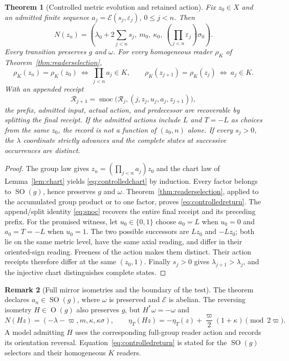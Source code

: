 \documentclass[10pt,letterpaper]{article}
\newtheorem{theorem}{Theorem}[section]
\theoremstyle{definition}\newtheorem{definition}[theorem]{Definition}
\newtheorem{remark}[theorem]{Remark}
\newcommand{\eps}{\varepsilon}
\newcommand{\SO}{\operatorname{SO}}
\newcommand{\OO}{\operatorname{O}}
\newcommand{\snoc}{\operatorname{snoc}}
\newcommand{\varp}{\varpi}
\begin{document}
\begin{theorem}[Controlled metric evolution and retained action]\label{thm:controlled}
Fix $z_0\in X$ and an admitted finite sequence $a_j=\mathcal E(s_j,\eps_j)$, $0\le j<n$. Then
\begin{equation}\label{eq:controlledchart}
 N(z_n)=\left(\lambda_0+2\sum_{j<n}s_j,\ m_0,\ \kappa_0,\ (\prod_{j<n}\eps_j)\sigma_0\right).
\end{equation}
Every transition preserves $g$ and $\omega$. For every homogeneous reader $\rho_K$ of Theorem~\ref{thm:readerselection},
\begin{equation}\label{eq:controlledreturn}
 \rho_K(z_n)=\rho_K(z_0)\ \Longleftrightarrow\ \prod_{j<n}a_j\in K,
 \qquad \rho_K(z_{j+1})=\rho_K(z_j)\ \Longleftrightarrow\ a_j\in K.
\end{equation}
With an appended receipt
\begin{equation}\label{eq:controlledrec}
 \mathcal R_{j+1}=\snoc\bigl(\mathcal R_j,(j,z_j,u_j,a_j,z_{j+1})\bigr),
\end{equation}
the prefix, admitted input, actual action, and predecessor are recoverable by splitting the final receipt. If the admitted actions include $L$ and $T=-L$ as choices from the same $z_0$, the record is not a function of $(z_0,n)$ alone. If every $s_j>0$, the $\lambda$ coordinate strictly advances and the complete states at successive occurrences are distinct.
\end{theorem}
\begin{proof}
The group law gives $z_n=(\prod_{j<n}a_j)z_0$ and the chart law of Lemma~\ref{lem:chart} yields \eqref{eq:controlledchart} by induction. Every factor belongs to $\SO(g)$, hence preserves $g$ and $\omega$. Theorem~\ref{thm:readerselection}, applied to the accumulated group product or to one factor, proves \eqref{eq:controlledreturn}. The append/split identity \eqref{eq:snoc} recovers the entire final receipt and its preceding prefix.
For the promised witness, let $u_0\in\{0,1\}$ choose $a_0=L$ when $u_0=0$ and $a_0=T=-L$ when $u_0=1$. The two possible successors are $Lz_0$ and $-Lz_0$; both lie on the same metric level, have the same axial reading, and differ in their oriented-sign reading. Freeness of the action makes them distinct. Their action receipts therefore differ at the same $(z_0,1)$. Finally $s_j>0$ gives $\lambda_{j+1}>\lambda_j$, and the injective chart distinguishes complete states.
\end{proof}

\begin{remark}[Full mirror isometries and the boundary of the test]
The theorem declares $a_n\in\SO(g)$, where $\omega$ is preserved and $\mathcal E$ is abelian. The reversing isometry $H\in\OO(g)$ also preserves $g$, but $H^*\omega=-\omega$ and
\begin{equation}
N(Hz)=(-\lambda-\varp,m,\kappa,\kappa\sigma),\qquad
\eta_T(Hz)=-\eta_T(z)+\frac{\varp}{2}(1+\kappa)\pmod{2\varp}.
\end{equation}
A model admitting $H$ uses the corresponding full-group reader action and records its orientation reversal. Equation~\eqref{eq:controlledreturn} is stated for the $\SO(g)$ selectors and their homogeneous $K$ readers.
\end{remark}
\end{document}
